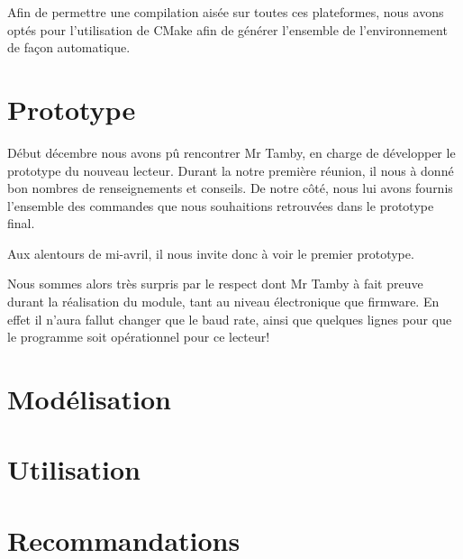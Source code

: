     Afin de permettre une compilation aisée sur toutes ces plateformes, nous avons
optés pour l'utilisation de CMake afin de générer l'ensemble de l'environnement de
façon automatique.



\section{Prototype}
    Début décembre nous avons pû rencontrer Mr Tamby, en charge de développer le
prototype du nouveau lecteur. Durant la notre première réunion, il nous à donné
bon nombres de renseignements et conseils. De notre côté, nous lui avons fournis
l'ensemble des commandes que nous souhaitions retrouvées dans le prototype final.

    Aux alentours de mi-avril, il nous invite donc à voir le premier prototype.


    Nous sommes alors très surpris par le respect dont Mr Tamby à fait preuve
durant la réalisation du module, tant au niveau électronique que firmware.
En effet il n'aura fallut changer que le baud rate, ainsi que quelques lignes
pour que le programme soit opérationnel pour ce lecteur!

\section{Modélisation}
\section{Utilisation}
\section{Recommandations}
